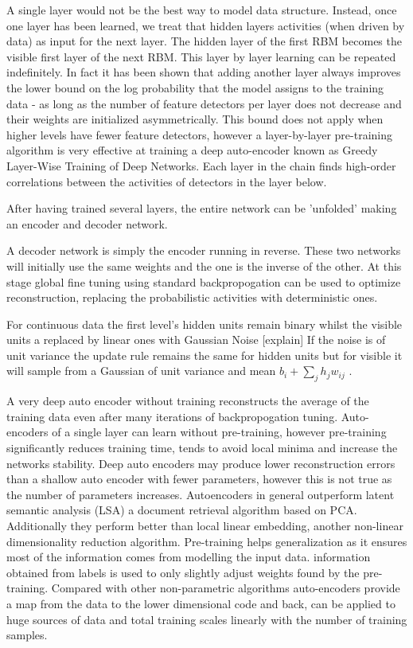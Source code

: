 A single layer would not be the best way to model data structure.
Instead, once one layer has been learned, we treat that hidden layers activities (when driven by data) as input for the next layer.
The hidden layer of the first RBM becomes the visible first layer of the next RBM\citep{hinton2006reducing}.
This layer by layer learning can be repeated indefinitely.
In fact it has been shown that adding another layer always improves the lower bound on the log probability that the model assigns to the training data - as long as the number of feature detectors per layer does not decrease and their weights are initialized asymmetrically\citep{hinton2006reducing}.
This bound does not apply when higher levels have fewer feature detectors, however a layer-by-layer pre-training algorithm is very effective at training a deep auto-encoder known as Greedy Layer-Wise Training of Deep Networks\citep{bengio2007greedy}.
Each layer in the chain finds high-order correlations between the activities of detectors in the layer below.

After having trained several layers, the entire network can be 'unfolded' making an encoder and decoder network\citep{dengthree}.

A decoder network is simply the encoder running in reverse.
These two networks will initially  use the same weights and the one is the inverse of the other.
At this stage global fine tuning using standard backpropogation can be used to optimize reconstruction, replacing the probabilistic activities with deterministic ones\citep{hinton2006reducing}.

For continuous data the first level's hidden units remain binary whilst the visible units a replaced by linear ones with Gaussian Noise [explain]
If the noise is of unit variance the update rule remains the same for hidden units but for visible it will sample from a Gaussian of unit variance and mean $b_i +\sum_j h_j w_{ij}$ \citep{hinton2006reducing}.


A very deep auto encoder without training reconstructs the average of the training data even after many iterations of backpropogation tuning\citep{hinton2006reducing}.
Auto-encoders of a single layer can learn without pre-training, however pre-training significantly reduces training time, tends to avoid local minima and increase the networks stability\citep{erhan2010does}.
Deep auto encoders may produce lower reconstruction errors than a shallow auto encoder with fewer parameters, however this is not true as the number of parameters increases.
Autoencoders in general outperform latent semantic analysis (LSA) a document retrieval algorithm based on PCA\citep{hinton2006reducing}.
Additionally they perform better than local linear embedding, another non-linear dimensionality reduction algorithm.
Pre-training helps generalization as it ensures most of the information comes from modelling the input data.
information obtained from labels is used to only slightly adjust weights found by the pre-training.
Compared with other non-parametric algorithms auto-encoders provide a map from the data to the lower dimensional code and back, can be applied to huge sources of data and total training scales linearly with the number of training samples\citep{hinton2006reducing}.

